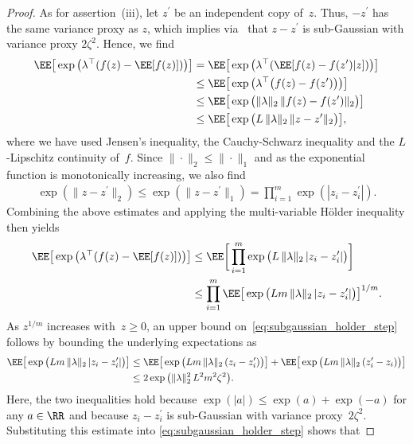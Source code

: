 \documentclass[11pt]{article}
\begin{document}
\begin{proof}
As for assertion~(iii), let $z^\prime$ be an independent copy of~$z$. Thus, $-z^\prime$ has the same variance proxy as $z$, which implies via~\cite[Exercise~2.13]{wainwright2019high} that $z - z^\prime$ is sub-Gaussian with variance proxy $2\zeta^2$. Hence, we find 
\begin{align*}
    \EE\big[ \exp\big(\lambda^\top(f(z)-\EE[f(z)])\big) \big] 
    & = \EE \big[ \exp\big(\lambda^\top(\EE [f(z)-f(z^\prime) | z])\big) \big] \\
    & \leq \EE \big[ \exp\big(\lambda^\top\big(f(z)-f(z^\prime)\big)\big) \big] \\ 
    & \leq \EE \big[ \exp\big(\|\lambda\|_2 \, \|f(z)-f(z^\prime)\|_2\big) \big] \\
    & \leq \EE \big[ \exp\big(L\,\|\lambda\|_2 \,\|z-z^\prime\|_2\big) \big] ,
\end{align*}
where we have used Jensen's inequality, the Cauchy-Schwarz inequality and the $L$-Lipschitz continuity of~$f$. Since $\|\cdot\|_2\leq\|\cdot\|_1$ and as the exponential function is monotonically increasing, we also find
\begin{align*}
    \exp(\|z-z^\prime\|_2)\leq\exp(\|z-z^\prime\|_1)=\prod_{i=1}^m\exp(|z_i-z^\prime_i|).
\end{align*}
Combining the above estimates and applying the multi-variable Hölder inequality then yields
\begin{align}
    \nonumber
    \EE\big[ \exp\big(\lambda^\top(f(z)-\EE[f(z)])\big) \big] & \leq \EE \bigg[ \prod_{i=1}^m\exp\big(L \, \|\lambda\|_2 \, |z_i-z^\prime_i|\big) \bigg] \\
    & \leq \prod_{i=1}^m \EE \big[ \exp\big(Lm \, \|\lambda\|_2 \, |z_i-z^\prime_i|\big) \big]^{1/m}.
    \label{eq:subgaussian_holder_step}
\end{align}
As $z^{1/m}$ increases with~$z\geq 0$, an upper bound on~\eqref{eq:subgaussian_holder_step} follows by bounding the underlying expectations as 
\begin{align*}
    \EE\big[ \exp\big(Lm\,\|\lambda\|_2 \,|z_i-z^\prime_i|\big) \big]
    & \leq \EE \big[ \exp\big(Lm \, \|\lambda\|_2 \, (z_i-z^\prime_i)\big) \big] + \EE \big[ \exp\big(Lm \, \|\lambda\|_2\, (z_i^\prime -z_i)\big) \big] \\
    & \leq 2\exp\big(\|\lambda\|_2^2 \, L^2m^2\zeta^2 \big).
\end{align*}
Here, the two inequalities hold because $\exp(|a|)\leq\exp(a)+\exp(-a)$ for any $a\in\RR$ and because $z_i - z_i^\prime$ is sub-Gaussian with variance proxy~$2\zeta^2$. Substituting this estimate into \eqref{eq:subgaussian_holder_step} shows that

\end{proof}
\end{document}
